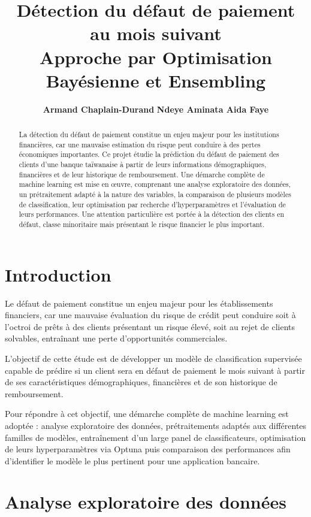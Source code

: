 \documentclass{article}
\title{\Large Détection du défaut de paiement au mois suivant \\ \large Approche par Optimisation Bayésienne et Ensembling}
\author{
\textbf{Armand Chaplain-Durand} \qquad \textbf{Ndeye Aminata Aida Faye}
}
\begin{document}
\maketitle

\begin{abstract}
La détection du défaut de paiement constitue un enjeu majeur pour les institutions financières, car une mauvaise estimation du risque peut conduire à des pertes économiques importantes. Ce projet étudie la prédiction du défaut de paiement des clients d'une banque taïwanaise à partir de leurs informations démographiques, financières et de leur historique de remboursement. Une démarche complète de machine learning est mise en œuvre, comprenant une analyse exploratoire des données, un prétraitement adapté à la nature des variables, la comparaison de plusieurs modèles de classification, leur optimisation par recherche d'hyperparamètres et l'évaluation de leurs performances. Une attention particulière est portée à la détection des clients en défaut, classe minoritaire mais présentant le risque financier le plus important.
\end{abstract}

\section*{Introduction}

Le défaut de paiement constitue un enjeu majeur pour les établissements financiers, car une mauvaise évaluation du risque de crédit peut conduire soit à l’octroi de prêts à des clients présentant un risque élevé, soit au rejet de clients solvables, entraînant une perte d’opportunités commerciales.

L'objectif de cette étude est de développer un modèle de classification supervisée capable de prédire si un client sera en défaut de paiement le mois suivant à partir de ses caractéristiques démographiques, financières et de son historique de remboursement.

Pour répondre à cet objectif, une démarche complète de machine learning est adoptée : analyse exploratoire des données, prétraitements adaptés aux différentes familles de modèles, entraînement d’un large panel de classificateurs, optimisation de leurs hyperparamètres via Optuna puis comparaison des performances afin d’identifier le modèle le plus pertinent pour une application bancaire.

\section{Analyse exploratoire des données}
\end{document}

